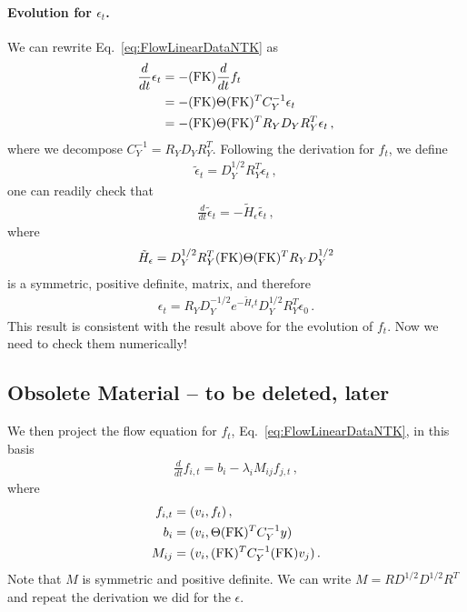 \documentclass[11pt]{article}
\begin{document}
\paragraph{Evolution for $\epsilon_t$.}
We can rewrite Eq.~\ref{eq:FlowLinearDataNTK} as 
\begin{align}
    \label{eq:FlowLinearDataNTKEpsilon}
    \frac{d}{dt} \epsilon_t &= - (\mathrm{FK}) \frac{d}{dt} f_t \nonumber \\
        &= - (\mathrm{FK}) \Theta (\mathrm{FK})^T C_Y^{-1} \epsilon_t \nonumber \\
        &= - (\mathrm{FK}) \Theta (\mathrm{FK})^T R_Y D_Y R_Y^T \epsilon_t\, ,
\end{align}
where we decompose $C_Y^{-1}=R_Y D_Y R_Y^T$.
Following the derivation for $f_t$, we define
\begin{align}
    \tilde{\epsilon}_t = D_Y^{1/2} R_Y^T \epsilon_t\, , 
\end{align}
one can readily check that 
\begin{align}
     \frac{d}{dt} \tilde{\epsilon}_t = 
        - \tilde{H}_\epsilon \tilde{\epsilon_t}\, ,
\end{align}
where 
\begin{align}
    \label{eq:HSymmetricDef}
    \tilde{H}_\epsilon  = D_Y^{1/2} R_Y^T (\mathrm{FK}) \Theta (\mathrm{FK})^T R_Y D_Y^{1/2}
\end{align}
is a symmetric, positive definite, matrix, and therefore
\begin{align}
    \label{eq:SolutionForEpsilon}
    \epsilon_t = R_Y D_Y^{-1/2} e^{-\tilde{H}_\epsilon t} D_Y^{1/2} R_Y^T \epsilon_0\, .
\end{align}
This result is consistent with the result above for the evolution of $f_t$. Now we need to 
check them numerically! 


\subsection*{Obsolete Material -- to be deleted, later}

We then project the flow equation for $f_t$, Eq.~\ref{eq:FlowLinearDataNTK}, in this basis
\begin{align}
    \label{eq:FlowEigenbasisNTK}
    \frac{d}{dt} f_{i,t} = b_i - \lambda_i M_{ij} f_{j,t}\, ,
\end{align} 
where
\begin{align}
    f_{i,t} &= (v_i, f_t)\, , \\
    b_i &= (v_i, \Theta (\mathrm{FK})^T C_Y^{-1} y)\, \\
    M_{ij} &= (v_i, (\mathrm{FK})^T C_Y^{-1} (\mathrm{FK}) v_j)\, .
\end{align}
Note that $M$ is symmetric and positive definite. We can write $M = R D^{1/2} D^{1/2} R^T$ and repeat the 
derivation we did for the $\epsilon$.
\end{document}
